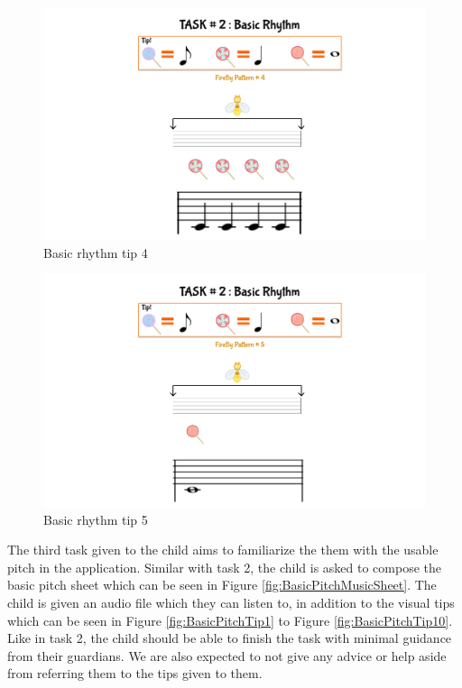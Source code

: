 \begin{figure}[H]
    \centering
    \includegraphics[width=15cm]{figures/NewFigures/BasicRhythmTip4.png}
    \caption{Basic rhythm tip 4}
    \label{fig:BasicRhythmTip4}
\end{figure}

\begin{figure}[H]
    \centering
    \includegraphics[width=15cm]{figures/NewFigures/BasicRhythmTip5.png}
    \caption{Basic rhythm tip 5}
    \label{fig:BasicRhythmTip5}
\end{figure}

The third task given to the child aims to familiarize the them with the usable pitch in the application. Similar with task 2, the child is asked to compose the basic pitch sheet which can be seen in Figure \ref{fig:BasicPitchMusicSheet}. The child is given an audio file which they can listen to, in addition to the visual tips which can be seen in Figure \ref{fig:BasicPitchTip1} to Figure \ref{fig:BasicPitchTip10}. Like in task 2, the child should be able to finish the task with minimal guidance from their guardians. We are also expected to not give any advice or help aside from referring them to the tips given to them.

